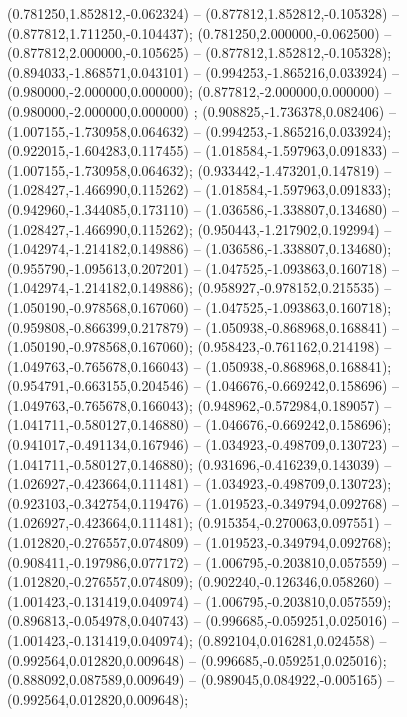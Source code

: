  (0.781250,1.852812,-0.062324) -- (0.877812,1.852812,-0.105328) -- (0.877812,1.711250,-0.104437);
 (0.781250,2.000000,-0.062500) -- (0.877812,2.000000,-0.105625) -- (0.877812,1.852812,-0.105328);
 (0.894033,-1.868571,0.043101) -- (0.994253,-1.865216,0.033924) -- (0.980000,-2.000000,0.000000);
 (0.877812,-2.000000,0.000000) -- (0.980000,-2.000000,0.000000) ;
 (0.908825,-1.736378,0.082406) -- (1.007155,-1.730958,0.064632) -- (0.994253,-1.865216,0.033924);
 (0.922015,-1.604283,0.117455) -- (1.018584,-1.597963,0.091833) -- (1.007155,-1.730958,0.064632);
 (0.933442,-1.473201,0.147819) -- (1.028427,-1.466990,0.115262) -- (1.018584,-1.597963,0.091833);
 (0.942960,-1.344085,0.173110) -- (1.036586,-1.338807,0.134680) -- (1.028427,-1.466990,0.115262);
 (0.950443,-1.217902,0.192994) -- (1.042974,-1.214182,0.149886) -- (1.036586,-1.338807,0.134680);
 (0.955790,-1.095613,0.207201) -- (1.047525,-1.093863,0.160718) -- (1.042974,-1.214182,0.149886);
 (0.958927,-0.978152,0.215535) -- (1.050190,-0.978568,0.167060) -- (1.047525,-1.093863,0.160718);
 (0.959808,-0.866399,0.217879) -- (1.050938,-0.868968,0.168841) -- (1.050190,-0.978568,0.167060);
 (0.958423,-0.761162,0.214198) -- (1.049763,-0.765678,0.166043) -- (1.050938,-0.868968,0.168841);
 (0.954791,-0.663155,0.204546) -- (1.046676,-0.669242,0.158696) -- (1.049763,-0.765678,0.166043);
 (0.948962,-0.572984,0.189057) -- (1.041711,-0.580127,0.146880) -- (1.046676,-0.669242,0.158696);
 (0.941017,-0.491134,0.167946) -- (1.034923,-0.498709,0.130723) -- (1.041711,-0.580127,0.146880);
 (0.931696,-0.416239,0.143039) -- (1.026927,-0.423664,0.111481) -- (1.034923,-0.498709,0.130723);
 (0.923103,-0.342754,0.119476) -- (1.019523,-0.349794,0.092768) -- (1.026927,-0.423664,0.111481);
 (0.915354,-0.270063,0.097551) -- (1.012820,-0.276557,0.074809) -- (1.019523,-0.349794,0.092768);
 (0.908411,-0.197986,0.077172) -- (1.006795,-0.203810,0.057559) -- (1.012820,-0.276557,0.074809);
 (0.902240,-0.126346,0.058260) -- (1.001423,-0.131419,0.040974) -- (1.006795,-0.203810,0.057559);
 (0.896813,-0.054978,0.040743) -- (0.996685,-0.059251,0.025016) -- (1.001423,-0.131419,0.040974);
 (0.892104,0.016281,0.024558) -- (0.992564,0.012820,0.009648) -- (0.996685,-0.059251,0.025016);
 (0.888092,0.087589,0.009649) -- (0.989045,0.084922,-0.005165) -- (0.992564,0.012820,0.009648);

